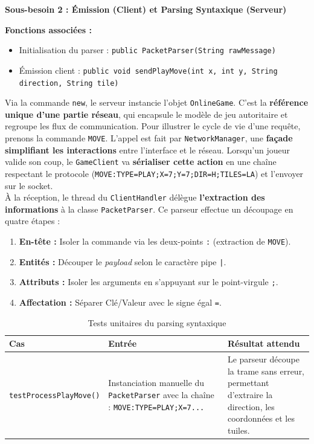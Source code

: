 \documentclass[a4paper]{article}
\begin{document}
\begin{besoinbox}
    \textbf{\large Sous-besoin 2 : Émission (Client) et Parsing Syntaxique (Serveur)}
    
    \vspace{2mm}
    \textbf{Fonctions associées :}
    \begin{itemize}
        \item Initialisation du parser : \texttt{public PacketParser(String rawMessage)}
        \item Émission client : \texttt{public void sendPlayMove(int x, int y, String direction, String tile)}
    \end{itemize}
    \vspace{2mm}

    Via la commande \texttt{new}, le serveur instancie l'objet \texttt{OnlineGame}. C’est la \textbf{référence unique d’une partie réseau}, qui encapsule le modèle de jeu autoritaire et regroupe les flux de communication.
    Pour illustrer le cycle de vie d'une requête, prenons la commande \texttt{MOVE}. L'appel est fait par \texttt{NetworkManager}, une \textbf{façade simplifiant les interactions} entre l'interface et le réseau. 
    Lorsqu'un joueur valide son coup, le \texttt{GameClient} va \textbf{sérialiser cette action} en une chaîne respectant le protocole (\texttt{MOVE:TYPE=PLAY;X=7;Y=7;DIR=H;TILES=LA}) et l’envoyer sur le socket.\\

    À la réception, le thread du \texttt{ClientHandler} délègue \textbf{l’extraction des informations} à la classe \texttt{PacketParser}. Ce parseur effectue un découpage en quatre étapes :
    \begin{enumerate}
        \item \textbf{En-tête :} Isoler la commande via les deux-points \texttt{:} (extraction de \texttt{MOVE}).
        \item \textbf{Entités :} Découper le \textit{payload} selon le caractère pipe \texttt{|}.
        \item \textbf{Attributs :} Isoler les arguments en s'appuyant sur le point-virgule \texttt{;}.
        \item \textbf{Affectation :} Séparer Clé/Valeur avec le signe égal \texttt{=}.
    \end{enumerate}
\end{besoinbox}

\begin{table}[H]
    \centering
    \small
    \begin{tabular}{p{4.5cm} p{4.5cm} p{5.5cm}}
        \toprule
        \textbf{Cas} & \textbf{Entrée} & \textbf{Résultat attendu} \\
        \midrule
        \texttt{testProcessPlayMove()} & Instanciation manuelle du \texttt{PacketParser} avec la chaîne : \texttt{MOVE:TYPE=PLAY;X=7...} & Le parseur découpe la trame sans erreur, permettant d'extraire la direction, les coordonnées et les tuiles. \\
        \bottomrule
    \end{tabular}
    \caption{Tests unitaires du parsing syntaxique}
\end{table}
\end{document}
